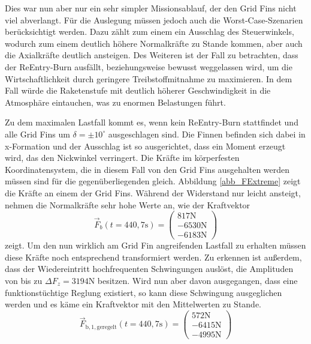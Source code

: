 Dies war nun aber nur ein sehr simpler Missionsablauf, der den Grid Fins nicht viel abverlangt. Für die Auslegung müssen jedoch auch die Worst-Case-Szenarien berücksichtigt werden. Dazu zählt zum einem ein Ausschlag des Steuerwinkels, wodurch zum einem deutlich höhere Normalkräfte zu Stande kommen, aber auch die Axialkräfte deutlich ansteigen. Des Weiteren ist der Fall zu betrachten, dass der ReEntry-Burn ausfällt, beziehungsweise bewusst weggelassen wird, um die Wirtschaftlichkeit durch geringere Treibstoffmitnahme zu maximieren. In dem Fall würde die Raketenstufe mit deutlich höherer Geschwindigkeit in die Atmosphäre eintauchen, was zu enormen Belastungen führt.

Zu dem maximalen Lastfall kommt es, wenn kein ReEntry-Burn stattfindet und alle Grid Fins um $\delta = \pm 10^\circ$ ausgeschlagen sind. Die Finnen befinden sich dabei in x-Formation und der Ausschlag ist so ausgerichtet, dass ein Moment erzeugt wird, das den Nickwinkel verringert. Die Kräfte im körperfesten Koordinatensystem, die in diesem Fall von den Grid Fins ausgehalten werden müssen sind für die gegenüberliegenden gleich. Abbildung \ref{abb_FExtreme} zeigt die Kräfte an einem der Grid Fins. Während der Widerstand nur leicht ansteigt, nehmen die Normalkräfte sehr hohe Werte an, wie der Kraftvektor
\begin{equation}
	\vec{F}_b(t=440,7\mathrm{s})
	=\left(\begin{array}{c}817\mathrm{N}\\-6530\mathrm{N}\\-6183\mathrm{N}\end{array}\right)
\end{equation}
zeigt. Um den nun wirklich am Grid Fin angreifenden Lastfall zu erhalten müssen diese Kräfte noch entsprechend transformiert werden. Zu erkennen ist außerdem, dass der Wiedereintritt hochfrequenten Schwingungen auslöst, die Amplituden von bis zu $\Delta F_z = 3194$N besitzen. Wird nun aber davon ausgegangen, dass eine funktionstüchtige Reglung existiert, so kann diese Schwingung ausgeglichen werden und es käme ein Kraftvektor mit den Mittelwerten zu Stande.
\begin{equation}\label{eq_Fmax}
\vec{F}_\mathrm{b, 1, geregelt}(t=440,7\mathrm{s})
=\left(\begin{array}{c}572\mathrm{N}\\-6415\mathrm{N}\\-4995\mathrm{N}\end{array}\right)
\end{equation}
